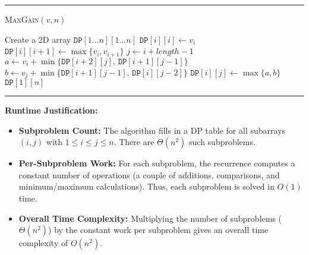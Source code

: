 \documentclass[11pt]{article}
\begin{document}
        \par\noindent\rule{\textwidth}{0.4pt}
        \smallskip        
        \textsc{MaxGain}$(v, n)$
        \begin{algorithmic}[1]
            \STATE Create a 2D array \(\texttt{DP}[1 \ldots n][1 \ldots n]\)
                \STATE \(\texttt{DP}[i][i] \gets v_i\) 
            \ENDFOR
                \STATE \(\texttt{DP}[i][i+1] \gets \max\{v_i, v_{i+1}\}\) 
            \ENDFOR
                    \STATE \(j \gets i + length - 1\)
                    \STATE \(a \gets v_i + \min\{\texttt{DP}[i+2][j],\, \texttt{DP}[i+1][j-1]\}\)
                    \STATE \(b \gets v_j + \min\{\texttt{DP}[i+1][j-1],\, \texttt{DP}[i][j-2]\}\)
                    \STATE \(\texttt{DP}[i][j] \gets \max\{a, b\}\)
                \ENDFOR
            \ENDFOR
            \RETURN \(\texttt{DP}[1][n]\)
        \end{algorithmic}
        \smallskip
        \par\noindent\rule{\textwidth}{0.4pt}
        
        \textbf{Runtime Justification:}
        \begin{itemize}
            \item \textbf{Subproblem Count:}  
            The algorithm fills in a DP table for all subarrays \((i,j)\) with \(1 \leq i \leq j \leq n\). There are \(\Theta(n^2)\) such subproblems.
            \item \textbf{Per-Subproblem Work:}  
            For each subproblem, the recurrence computes a constant number of operations (a couple of additions, comparisons, and minimum/maximum calculations). Thus, each subproblem is solved in \(O(1)\) time.
            \item \textbf{Overall Time Complexity:}  
            Multiplying the number of subproblems (\(\Theta(n^2)\)) by the constant work per subproblem gives an overall time complexity of \(O(n^2)\).
        \end{itemize}

    \newpage

    
    
\end{document}
